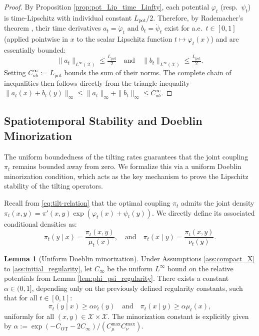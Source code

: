 \documentclass[11pt]{article}
\theoremstyle{definition}
\newtheorem{lemma}[theorem]{Lemma}
\numberwithin{equation}{section}%
\begin{document}
{\begin{proof}
By Proposition \ref{prop:pot_Lip_time_Linfty}, each potential $\varphi_t$ (resp.\ $\psi_t$) is time-Lipschitz with individual constant $L_{\mathrm{pot}}/2$. Therefore, by Rademacher's theorem \citep[Theorem~3.1.2]{evans2015measure}, their time derivatives $a_t = \dot\varphi_t$ and $b_t = \dot\psi_t$ exist for a.e.\ $t \in [0,1]$ (applied pointwise in $x$ to the scalar Lipschitz function $t\mapsto\varphi_t(x)$) and are essentially bounded:
\[
\|a_t\|_{L^\infty(\mathcal{X})} \le \tfrac{L_{\mathrm{pot}}}{2} \quad \text{and} \quad \|b_t\|_{L^\infty(\mathcal{X})} \le \tfrac{L_{\mathrm{pot}}}{2}.
\]
Setting $C_{ab}^\infty := L_{\mathrm{pot}}$ bounds the sum of their norms. The complete chain of inequalities then follows directly from the triangle inequality $\|a_t(x) + b_t(y)\|_\infty \le \|a_t\|_\infty + \|b_t\|_\infty \le C_{ab}^\infty$.
\end{proof}

\subsection{Spatiotemporal Stability and Doeblin Minorization}
\label{app:stab_bound_titling_rate}
The uniform boundedness of the tilting rates guarantees that the joint coupling $\pi_t$ remains bounded away from zero. We formalize this via a uniform Doeblin minorization condition, which acts as the key mechanism to prove the Lipschitz stability of the tilting operators.

Recall from \eqref{eq:tilt-relation} that the optimal coupling $\pi_t$ admits the joint density $\pi_t(x,y) = \pi'(x,y) \exp(\varphi_t(x) + \psi_t(y))$. We directly define its associated conditional densities as:
\begin{equation}
\label{eq:cond_pi_t}
\pi_t(y \mid x) = \frac{\pi_t(x,y)}{\mu_t(x)}, \quad \text{and} \quad \pi_t(x \mid y) = \frac{\pi_t(x,y)}{\nu_t(y)}.
\end{equation}

\begin{lemma}[Uniform Doeblin minorization]
\label{lem:doeblin_from_bounds}
Under Assumptions \ref{ass:compact_X} to \ref{ass:initial_regularity}, let $C_\infty$ be the uniform $L^\infty$ bound on the relative potentials from Lemma \ref{lem:phi_psi_regularity}. There exists a constant $\alpha \in (0, 1]$, depending only on the previously defined regularity constants, such that for all $t \in [0,1]$:
\[
\pi_t(y \mid x) \ge \alpha \nu_t(y) \quad \text{and} \quad \pi_t(x \mid y) \ge \alpha \mu_t(x),
\]
uniformly for all $(x, y) \in \mathcal{X} \times \mathcal{X}$. The minorization constant is explicitly given by $\alpha := \exp(-C_\mathrm{OT} - 2C_\infty) / (C_{\mu}^{\max} C_{\nu}^{\max})$.
\end{lemma}

}
\end{document}
